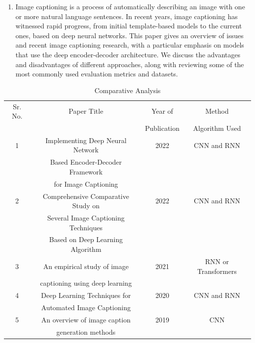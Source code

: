 \documentclass[oneside,a4paper,12pt]{report}
\begin{document}
\begin{enumerate}
\item{  Image captioning is a process of automatically describing an image with one or more natural language sentences. In recent years, image captioning has witnessed rapid progress, from initial template-based models to the current ones, based on deep neural networks. This paper gives an overview of issues and recent image captioning research, with a particular emphasis on models that use the deep encoder-decoder architecture. We discuss the advantages and disadvantages of different approaches, along with reviewing some of the most commonly used evaluation metrics and datasets.}\cite{r4}

\end{enumerate}
 

\begin{table}[!htbp]
\begin{center}
\def\arraystretch{1.5}
  \begin{tabular}{| c | c | c | c |}
\hline
Sr. No. &	Paper Title &	Year of & Method \\
&	 &	Publication & Algorithm Used \\

\hline
1 &	Implementing Deep Neural Network  &	 2022  &CNN and RNN \\
 &	 Based Encoder-Decoder Framework    &	 & \\
 &	 for Image Captioning  & 	 &\\
 
\hline
2&Comprehensive Comparative Study on 	  &2022	   &CNN and RNN\\
 & Several Image Captioning Techniques  	  &	 & \\
 &  Based on Deep Learning Algorithm &&\\

 

\hline
3 &An empirical study of image 	  &2021	   &RNN or Transformers\\
 &captioning using deep learning	  &	 &  \\
\hline

\hline
4&	Deep Learning Techniques for  &	 2020 &CNN and RNN \\
 &	Automated Image Captioning &	 & \\
\hline
5&An overview of image caption  	  &2019   &CNN\\
 &generation methods	  &	 & \\
\hline


\end{tabular}
 \caption { Comparative Analysis }
 \label{tab:CompAna}
\end{center}

\end{table}
\end{document}
